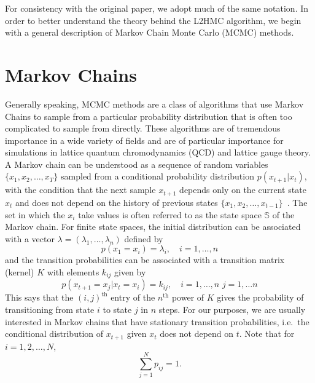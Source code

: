 \documentclass[../main.tex]{subfiles}
\begin{document}
For consistency with the original paper, we adopt much of the same notation.
%
In order to better understand the theory behind the L2HMC algorithm, we begin with a general description of Markov
Chain Monte Carlo (MCMC) methods.
%
\section{Markov Chains}
Generally speaking, MCMC methods are a class of algorithms that use Markov Chains to sample from a particular
probability distribution that is often too complicated to sample from directly.
%
These algorithms are of tremendous importance in a wide variety of fields and are of particular importance for
simulations in lattice quantum chromodynamics (QCD) and lattice gauge theory.
%
A Markov chain can be understood as a sequence of random variables ${\{x_1, x_2, \ldots, x_T\}}$ sampled from a
conditional probability distribution $p{(x_{t+1}|x_t)}$, with the condition that the next sample $x_{t+1}$ depends only
on the current state $x_t$ and does not depend on the history of previous states ${\{x_1, x_2, \ldots,
x_{t-1}\}}$~\cite{brooks2011handbook}.
%
The set in which the $x_i$ take values is often referred to as the state space $\mathbb{S}$ of the Markov chain.
%
For finite state spaces, the initial distribution can be associated with a vector $\lambda= {(\lambda_1, \ldots,
\lambda_n)}$ defined by
%
\begin{equation}
  p(x_1 = x_i) = \lambda_i, \quad i = 1, \ldots, n
\end{equation}
%
and the transition probabilities can be associated with a transition matrix (kernel) $K$ with elements $k_{ij}$ given
by \begin{equation}
  p(x_{t+1} = x_j | x_t = x_i) = k_{ij}, \quad i = 1, \ldots, n \,\, j = 1, \ldots n
\end{equation}
This says that the ${(i, j)}^{\mathrm{th}}$ entry of the $n^{\mathrm{th}}$ power of $K$ gives the probability of
transitioning from state $i$ to state $j$ in $n$ steps.
%
For our purposes, we are usually interested in Markov chains that have stationary transition probabilities, i.e.\ the
conditional distribution of $x_{t+1}$ given $x_t$ does not depend on $t$. Note that for $i = 1, 2, \ldots, N$,
\begin{equation}
  \sum_{j=1}^{N} p_{ij} = 1.
\end{equation}
\end{document}
